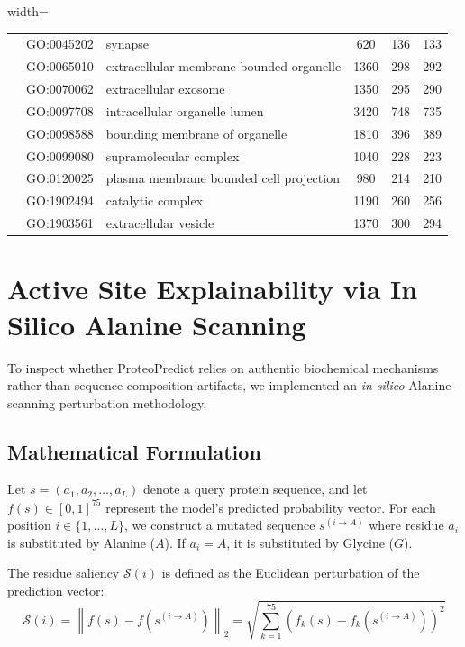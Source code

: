 \documentclass[10pt]{article}
\begin{document}
\begin{table}[h!]
\begin{adjustbox}{width=\textwidth}
\begin{tabular}{lllccc}
& GO:0045202 & synapse & 620 & 136 & 133 \\
& GO:0065010 & extracellular membrane-bounded organelle & 1360 & 298 & 292 \\
& GO:0070062 & extracellular exosome & 1350 & 295 & 290 \\
& GO:0097708 & intracellular organelle lumen & 3420 & 748 & 735 \\
& GO:0098588 & bounding membrane of organelle & 1810 & 396 & 389 \\
& GO:0099080 & supramolecular complex & 1040 & 228 & 223 \\
& GO:0120025 & plasma membrane bounded cell projection & 980 & 214 & 210 \\
& GO:1902494 & catalytic complex & 1190 & 260 & 256 \\
& GO:1903561 & extracellular vesicle & 1370 & 300 & 294 \\
\bottomrule
\end{tabular}
\end{adjustbox}
\end{table}

\section{Active Site Explainability via In Silico Alanine Scanning}

To inspect whether ProteoPredict relies on authentic biochemical mechanisms rather than sequence composition artifacts, we implemented an \textit{in silico} Alanine-scanning perturbation methodology.

\subsection{Mathematical Formulation}
Let $s = (a_1, a_2, \dots, a_L)$ denote a query protein sequence, and let $f(s) \in [0, 1]^{75}$ represent the model's predicted probability vector. For each position $i \in \{1, \dots, L\}$, we construct a mutated sequence $s^{(i \to A)}$ where residue $a_i$ is substituted by Alanine ($A$). If $a_i = A$, it is substituted by Glycine ($G$).

The residue saliency $\mathcal{S}(i)$ is defined as the Euclidean perturbation of the prediction vector:
\begin{equation}
\mathcal{S}(i) = \left\| f(s) - f(s^{(i \to A)}) \right\|_2 = \sqrt{\sum_{k=1}^{75} \left( f_k(s) - f_k(s^{(i \to A)}) \right)^2}
\end{equation}
\end{document}
